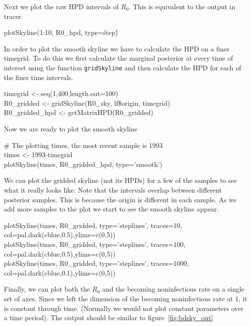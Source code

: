 \documentclass[11pt]{article}
\begin{document}
Next we plot the raw HPD intervals of $R_0$. This is equivalent to the output in tracer. 

\begin{framed}
plotSkyline(1:10, R0\_hpd, type=\'step\')
\end{framed}

In order to plot the smooth skyline we have to calculate the HPD on a finer timegrid. To do this we first calculate the marginal posterior at every time of interest using the function \texttt{gridSkyline} and then calculate the HPD for each of the finer time intervals. 

\begin{framed}
timegrid <- seq(1,400,length.out=100) \\
R0\_gridded     <- gridSkyline(R0\_sky,    lf\$origin, timegrid) \\
R0\_gridded\_hpd <- getMatrixHPD(R0\_gridded)
\end{framed}

Now we are ready to plot the smooth skyline

\begin{framed}
\# The plotting times, the most recent sample is 1993 \\
times     <- 1993-timegrid \\
plotSkyline(times, R0\_gridded\_hpd, type='smooth')
\end{framed}


We can plot the gridded skyline (not its HPDs) for a few of the samples to see what it really looks like. Note that the intervals overlap between different posterior samples. This is because the origin is different in each sample. As we add more samples to the plot we start to see the smooth skyline appear. 

\begin{framed}
plotSkyline(times, R0\_gridded, type='steplines', traces=10, col=pal.dark(cblue,0.5),ylims=c(0,5)) \\
plotSkyline(times, R0\_gridded, type='steplines', traces=100, col=pal.dark(cblue,0.5),ylims=c(0,5)) \\
plotSkyline(times, R0\_gridded, type='steplines', traces=1000, col=pal.dark(cblue,0.1),ylims=c(0,5))
\end{framed}

Finally, we can plot both the $R_0$ and the becoming noninfectious rate on a single set of axes. Since we left the dimension of the becoming noninfectious rate at 1, it is constant through time. (Normally we would not plot constant parameters over a time period). The output should be similar to figure~\ref{fig:bdsky_out}
\end{document}
